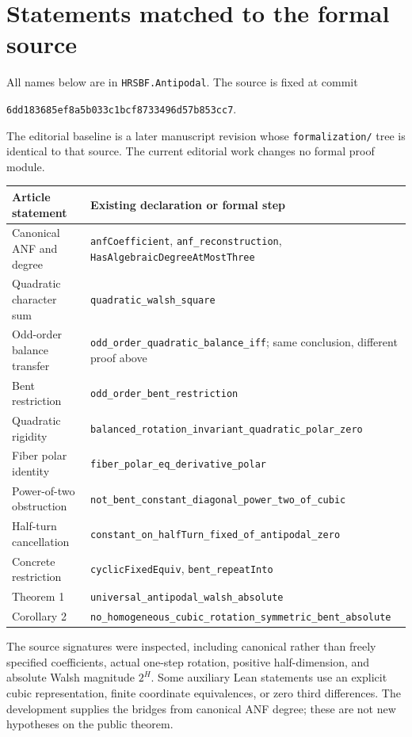 \documentclass[11pt,a4paper]{article}
\begin{document}
\section{Statements matched to the formal source}
All names below are in \nolinkurl{HRSBF.Antipodal}. The source is fixed at commit
\begin{center}\small\nolinkurl{6dd183685ef8a5b033c1bcf8733496d57b853cc7}.\end{center}
The editorial baseline is a later manuscript revision whose \nolinkurl{formalization/} tree is identical to that source. The current editorial work changes no formal proof module.
\begingroup\small
\def\UrlBreaks{\do\_}
\setlength{\tabcolsep}{3pt}
\begin{longtable}{@{}>{\raggedright\arraybackslash}p{}>{\raggedright\arraybackslash}p{}@{}}
\toprule Article statement & Existing declaration or formal step \\\midrule
\endhead
Canonical ANF and degree & \nolinkurl{anfCoefficient}, \nolinkurl{anf_reconstruction}, \nolinkurl{HasAlgebraicDegreeAtMostThree} \\
Quadratic character sum & \nolinkurl{quadratic_walsh_square} \\
Odd-order balance transfer & \nolinkurl{odd_order_quadratic_balance_iff}; same conclusion, different proof above \\
Bent restriction & \nolinkurl{odd_order_bent_restriction} \\
Quadratic rigidity & \nolinkurl{balanced_rotation_invariant_quadratic_polar_zero} \\
Fiber polar identity & \nolinkurl{fiber_polar_eq_derivative_polar} \\
Power-of-two obstruction & \nolinkurl{not_bent_constant_diagonal_power_two_of_cubic} \\
Half-turn cancellation & \nolinkurl{constant_on_halfTurn_fixed_of_antipodal_zero} \\
Concrete restriction & \nolinkurl{cyclicFixedEquiv}, \nolinkurl{bent_repeatInto} \\
Theorem 1 & \nolinkurl{universal_antipodal_walsh_absolute} \\
Corollary 2 & \nolinkurl{no_homogeneous_cubic_rotation_symmetric_bent_absolute} \\
\bottomrule
\end{longtable}
\endgroup
The source signatures were inspected, including canonical rather than freely specified coefficients, actual one-step rotation, positive half-dimension, and absolute Walsh magnitude $2^H$. Some auxiliary Lean statements use an explicit cubic representation, finite coordinate equivalences, or zero third differences. The development supplies the bridges from canonical ANF degree; these are not new hypotheses on the public theorem.
\end{document}
